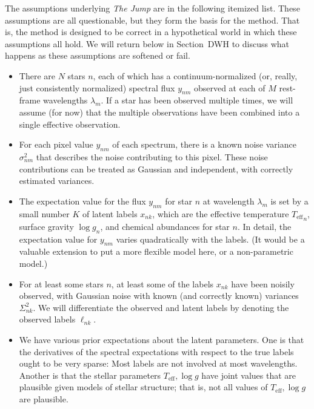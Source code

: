 \documentclass[12pt, letterpaper]{article}
\newcommand{\project}[1]{\textsl{{#1}}}
\newcommand{\sectionname}{Section}
\newcommand{\Teff}{{T_{\mathrm{eff}}}}
\newcommand{\logg}{{\log g}}
\begin{document}
The assumptions underlying \project{The Jump} are in the following
itemized list. These assumptions are all questionable, but they form
the basis for the method. That is, the method is designed to be correct
in a hypothetical world in which these assumptions all hold. We will
return below in \sectionname~DWH to discuss what happens as these
assumptions are softened or fail.
\begin{itemize}\itemsep0ex
\item There are $N$ stars $n$, each of which has a
  continuum-normalized (or, really, just consistently normalized)
  spectral flux $y_{nm}$ observed at each of $M$ rest-frame
  wavelengths $\lambda_m$. If a star has been observed multiple times,
  we will assume (for now) that the multiple observations have been
  combined into a single effective observation.
\item For each pixel value $y_{nm}$ of each spectrum, there is a known
  noise variance $\sigma^2_{nm}$ that describes the noise contributing
  to this pixel. These noise contributions can be treated as Gaussian
  and independent, with correctly estimated variances.
\item The expectation value for the flux $y_{nm}$ for star $n$ at
  wavelength $\lambda_m$ is set by a small number $K$ of latent labels
  $x_{nk}$, which are the effective temperature $\Teff_n$,
  surface gravity $\logg_n$, and chemical abundances for star $n$.
  In detail, the expectation value for $y_{nm}$ varies quadratically
  with the labels. (It would be a valuable extension to put a more
  flexible model here, or a non-parametric model.)
\item For at least some stars $n$, at least some of the labels
  $x_{nk}$ have been noisily observed, with Gaussian noise with known
  (and correctly known) variances $\Sigma^2_{nk}$. We will
  differentiate the observed and latent labels by denoting the
  observed labels $\ell_{nk}$.
\item We have various prior expectations about the latent parameters.
  One is that the derivatives of the spectral expectations with
  respect to the true labels ought to be very sparse: Most labels are
  not involved at most wavelengths. Another is that the stellar
  parameters $\Teff, \logg$ have joint values that are plausible
  given models of stellar structure; that is, not all values of
  $\Teff, \logg$ are plausible.
\end{itemize}
\end{document}
